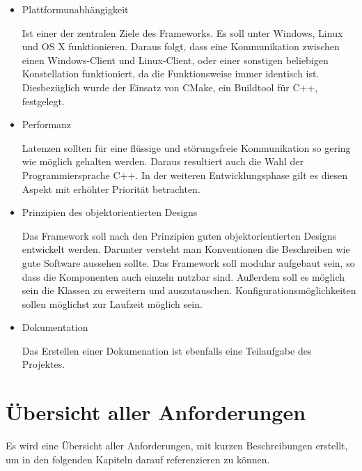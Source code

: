 \begin{itemize} 
\item Plattformunabhängigkeit

Ist einer der zentralen Ziele des Frameworks. Es soll unter Windows, Linux und OS X funktionieren. Daraus folgt, dass eine Kommunikation zwischen einen Windows-Client und Linux-Client, oder einer sonstigen beliebigen Konstellation funktioniert, da die Funktionsweise immer identisch ist. Diesbezüglich wurde der Einsatz von CMake, ein Buildtool für C++, festgelegt.
		
\item Performanz

Latenzen sollten für eine flüssige und störungsfreie Kommunikation so gering wie möglich gehalten werden. Daraus resultiert auch die Wahl der Programmiersprache C++. In der weiteren Entwicklungsphase gilt es diesen Aspekt mit erhöhter Priorität betrachten.
		
\item Prinzipien des objektorientierten Designs

Das Framework soll nach den Prinzipien guten objektorientierten Designs entwickelt werden. Darunter versteht man Konventionen die Beschreiben wie gute Software aussehen sollte. Das Framework soll modular aufgebaut sein, so dass die Komponenten auch einzeln nutzbar sind. Außerdem soll es möglich sein die Klassen zu erweitern und auszutauschen. Konfigurationsmöglichkeiten sollen möglichst zur Laufzeit möglich sein. 
		
\item Dokumentation

Das Erstellen einer Dokumenation ist ebenfalls eine Teilaufgabe des Projektes.
		
\end{itemize}

\newpage
\section{Übersicht aller Anforderungen}
Es wird eine Übersicht aller Anforderungen, mit kurzen Beschreibungen erstellt, um in den folgenden Kapiteln darauf referenzieren zu können.


